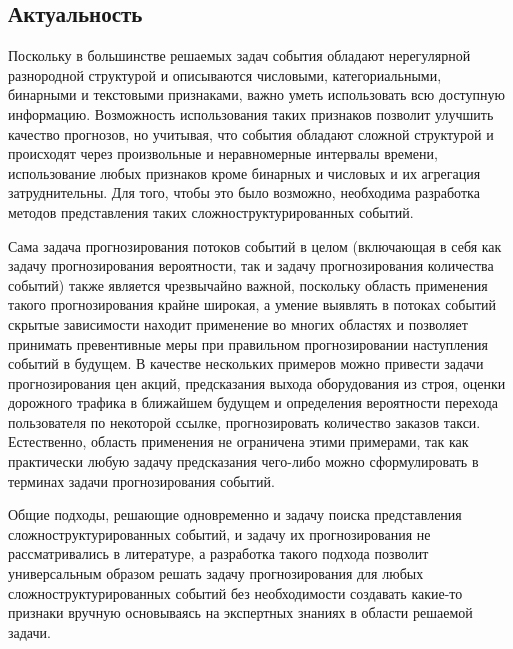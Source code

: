 \subsection{Актуальность}
Поскольку в большинстве решаемых задач события обладают нерегулярной разнородной структурой и описываются числовыми, категориальными, бинарными и текстовыми признаками, важно уметь использовать всю доступную информацию. Возможность использования таких признаков позволит улучшить качество прогнозов, но учитывая, что события обладают сложной структурой и происходят через произвольные и неравномерные интервалы времени, использование любых признаков кроме бинарных и числовых и их агрегация затруднительны. Для того, чтобы это было возможно, необходима разработка методов представления таких сложноструктурированных событий.

Сама задача прогнозирования потоков событий в целом (включающая в себя как задачу прогнозирования вероятности, так и задачу прогнозирования количества событий) также является чрезвычайно важной, поскольку область применения такого прогнозирования крайне широкая, а умение выявлять в потоках событий скрытые зависимости находит применение во многих областях и позволяет принимать превентивные меры при правильном прогнозировании наступления событий в будущем. В качестве нескольких примеров можно привести задачи прогнозирования цен акций, предсказания выхода оборудования из строя, оценки дорожного трафика в ближайшем будущем и определения вероятности перехода пользователя по некоторой ссылке, прогнозировать количество заказов такси. Естественно, область применения не ограничена этими примерами, так как практически любую задачу предсказания чего-либо можно сформулировать в терминах задачи прогнозирования событий.

Общие подходы, решающие одновременно и задачу поиска представления сложноструктурированных событий, и задачу их прогнозирования не рассматривались в литературе, а разработка такого подхода позволит универсальным образом решать задачу прогнозирования для любых сложноструктурированных событий без необходимости создавать какие-то признаки вручную основываясь на экспертных знаниях в области решаемой задачи.